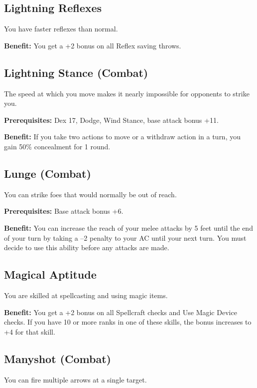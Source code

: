 \subsection{Lightning Reflexes}

				
You have faster reflexes than normal.
				
\textbf{Benefit:} You get a +2 bonus on all Reflex saving throws.
				
\subsection{Lightning Stance (Combat)}

				
The speed at which you move makes it nearly impossible for opponents to strike you.
				
\textbf{Prerequisites:} Dex 17, Dodge, Wind Stance, base attack bonus +11.
				
\textbf{Benefit:} If you take two actions to move or a withdraw action in a turn, you gain 50\% concealment for 1 round.
				
\subsection{Lunge (Combat)}

				
You can strike foes that would normally be out of reach.
				
\textbf{Prerequisites:} Base attack bonus +6.
				
\textbf{Benefit:} You can increase the reach of your melee attacks by 5 feet until the end of your turn by taking a --2 penalty to your AC until your next turn. You must decide to use this ability before any attacks are made.
				
\subsection{Magical Aptitude}

				
You are skilled at spellcasting and using magic items.
				
\textbf{Benefit:} You get a +2 bonus on all Spellcraft checks and Use Magic Device checks. If you have 10 or more ranks in one of these skills, the bonus increases to +4 for that skill.
				
\subsection{Manyshot (Combat)}

				
You can fire multiple arrows at a single target.
				

